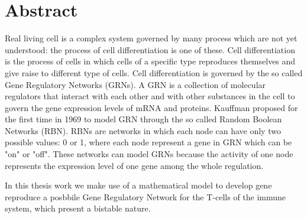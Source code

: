 
\chapter*{Abstract}

Real living cell is a complex system governed by many process which are not yet understood: the process of cell differentiation is one of these. 
Cell  differentiation is the process of cells in which cells of a specific type reproduces themselves and give raise to different type of cells.
Cell differentiation is governed by the so called Gene Regulatory Networks (GRNs).
A GRN is a collection of molecular regulators that interact with each other and with other substances in the cell to govern the gene expression levels of mRNA and proteins. 
Kauffman proposed for the first time in 1969 to model GRN through the so called Random Boolean Networks (RBN).
RBNs are networks in which each node can have only two possible values: 0 or 1, where each node represent a gene in GRN which can be "on" or "off".
These networks can model GRNs because the activity of one node represents the expression level of one gene among the whole regulation.

In this thesis work we make use of a mathematical model to develop gene reproduce a posbbile Gene Regulatory Network for the T-cells of the immune system, which present a bistable nature.


